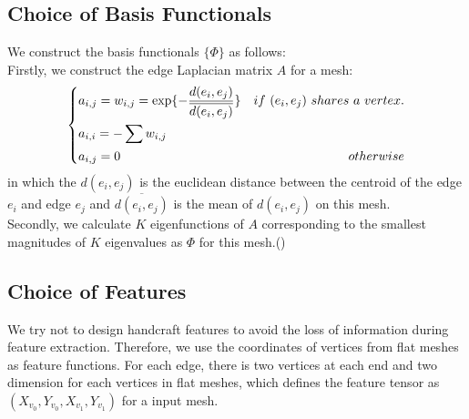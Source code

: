 \subsection{Choice of Basis Functionals}
We construct the basis functionals $\{\Phi\}$ as follows:\\
Firstly, we construct the edge Laplacian matrix $A$ for a mesh:
\begin{equation}
\left\{
\begin{gathered}
a_{i,j} = w_{i,j} = \exp\{-\frac{d(e_i,e_j)}{\overline{d(e_i,e_j)}}\} \quad \hfill if~(e_i,e_j)~shares~a~vertex. \\
a_{i,i} = -\sum w_{i,j} \quad \hfill \\
a_{i,j} = 0 \quad \hfill otherwise \\
\end{gathered}
\right.
\end{equation}
in which the $d(e_i,e_j)$ is the euclidean distance between the centroid of the edge $e_i$ and edge $e_j$ and $\overline{d(e_i,e_j)}$ is the mean of $d(e_i,e_j)$ on this mesh.\\
Secondly, we calculate $K$ eigenfunctions of $A$ corresponding to the smallest magnitudes of $K$ eigenvalues as $\Phi$ for this mesh.({\color{blue}{We now use ``scipy.sparse.linalg.eigs" in python to solve this problem. It seems that it is also use ``ARPACK" routines as backend the same as other solvers. We choose ``SM" mode to make the solver to choose eigenvalues with smallest magnitudes}})
\subsection{Choice of Features}
We try not to design handcraft features to avoid the loss of information during feature extraction. Therefore, we use the coordinates of vertices from flat meshes as feature functions. For each edge, there is two vertices at each end and two dimension for each vertices in flat meshes, which defines the feature tensor as $(X_{v_0},Y_{v_0},X_{v_1},Y_{v_1})$ for a input mesh.